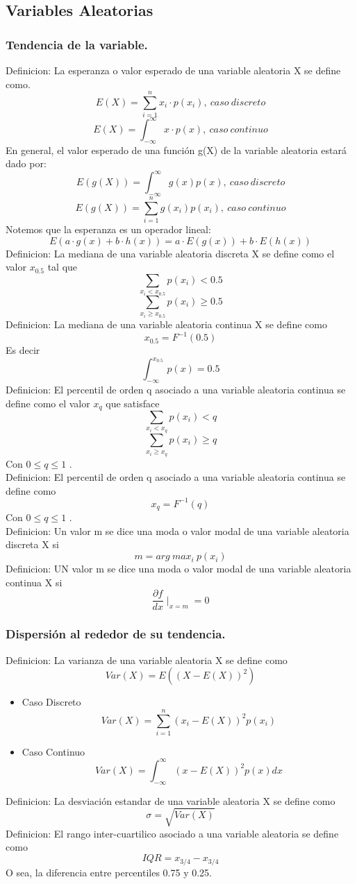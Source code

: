 \subsection{Variables Aleatorias}
	\subsubsection{\bf Tendencia de la variable.}
	Definicion: La esperanza o valor esperado de una variable aleatoria X se define como.
	$$ E(X) = \sum_{i=1}^n x_i \cdotp p(x_i) ,\ caso\ discreto$$
	$$ E(X) = \int_{- \infty}^{\infty} x \cdotp p(x) ,\ caso\ continuo$$
	En general, el valor esperado de una funci\'on g(X) de la variable aleatoria estar\'a dado por:
	$$ E(g(X)) = \int_{- \infty}^{\infty} g(x)p(x) ,\ caso\ discreto $$
	$$ E(g(X)) = \sum_{i=1}^{n} g(x_i)p(x_i) ,\ caso\ continuo $$
	Notemos que la esperanza es un operador lineal:
	$$ E(a \cdotp g(x) + b \cdotp h(x)) = a \cdotp E(g(x)) + b \cdotp E(h(x))$$
	Definicion: La mediana de una variable aleatoria discreta X se define como el valor $ x_0.5 $ tal que
	$$ \sum_{x_i < x_{0.5}} p(x_i) < 0.5 $$
	$$ \sum_{x_i \ge x_{0.5}} p(x_i) \ge 0.5 $$
	Definicion: La mediana de una variable aleatoria continua X se define como
	$$ x_{0.5} = F^{-1}(0.5)$$
	Es decir
	$$ \int_{- \infty}^{x_{0.5}} p(x) = 0.5 $$
	Definicion: El percentil de orden q asociado a una variable aleatoria continua se define como el valor $ x_q $ que satisface
	$$ \sum_{x_i < x_q} p(x_i) < q  $$
	$$ \sum_{x_i \ge x_q} p(x_i) \ge q $$
	Con $ 0 \le q \le 1 $ .\\
	Definicion: El percentil de orden q asociado a una variable aleatoria continua se define como
	$$ x_q = F^{-1}(q) $$
	Con $ 0 \le q \le 1 $ .\\
	Definicion: Un valor m se dice una moda o valor modal de una variable aleatoria discreta X si
	$$ m = arg\ max_{i}\ p(x_i)  $$
	Definicion: UN valor m se dice una moda o valor modal de una variable aleatoria continua X si
	$$ \frac{\partial f}{dx} \mid_{x=m} = 0  $$
	\subsubsection{\bf Dispersi\'on al rededor de su tendencia.}
		Definicion: La varianza de una variable aleatoria X se define como 
		$$ Var(X) = E((X - E(X))^2)  $$
		\begin{itemize}
			\item Caso Discreto
				$$ Var(X) = \sum_{i=1}^{n} (x_i - E(X))^2 p(x_i) $$
			\item Caso Continuo
				$$ Var(X) = \int_{- \infty}^{\infty} (x - E(X))^2 p(x)dx  $$
		\end{itemize}
		Definicion: La desviaci\'on estandar de una variable aleatoria X se define como
		$$ \sigma = \sqrt{Var(X)}  $$
		Definicion: El rango inter-cuartilico asociado a una variable aleatoria se define como
		$$ IQR = x_{3/4} - x_{3/4}  $$
		O sea, la diferencia entre percentiles 0.75 y 0.25.
	
